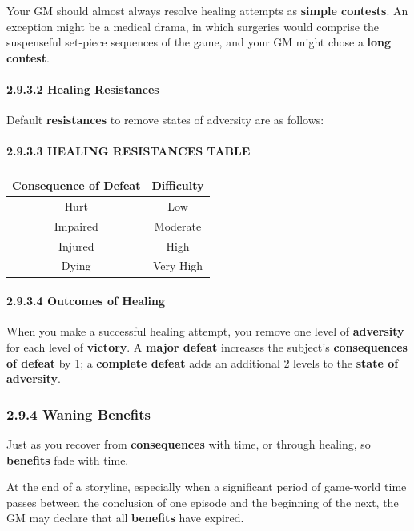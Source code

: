 \documentclass[
]{article}
\begin{document}
Your GM should almost always resolve healing attempts as \textbf{simple
contests}. An exception might be a medical drama, in which surgeries
would comprise the suspenseful set-piece sequences of the game, and your
GM might chose a \textbf{long contest}.

\hypertarget{healing-resistances}{%
\paragraph{2.9.3.2 Healing Resistances}\label{healing-resistances}}

Default \textbf{resistances} to remove states of adversity are as
follows:

\hypertarget{healing-resistances-table}{%
\paragraph{2.9.3.3 HEALING RESISTANCES
TABLE}\label{healing-resistances-table}}

\begin{longtable}[]{@{}cc@{}}
\toprule
Consequence of Defeat & Difficulty\tabularnewline
\midrule
\endhead
Hurt & Low\tabularnewline
Impaired & Moderate\tabularnewline
Injured & High\tabularnewline
Dying & Very High\tabularnewline
\bottomrule
\end{longtable}

\hypertarget{outcomes-of-healing}{%
\paragraph{2.9.3.4 Outcomes of Healing}\label{outcomes-of-healing}}

When you make a successful healing attempt, you remove one level of
\textbf{adversity} for each level of \textbf{victory}. A \textbf{major
defeat} increases the subject's \textbf{consequences of defeat} by 1; a
\textbf{complete defeat} adds an additional 2 levels to the
\textbf{state of adversity}.

\hypertarget{waning-benefits}{%
\subsubsection{2.9.4 Waning Benefits}\label{waning-benefits}}

Just as you recover from \textbf{consequences} with time, or through
healing, so \textbf{benefits} fade with time.

At the end of a storyline, especially when a significant period of
game-world time passes between the conclusion of one episode and the
beginning of the next, the GM may declare that all \textbf{benefits}
have expired.
\end{document}

